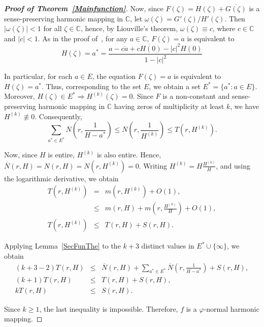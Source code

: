 \documentclass[10pt,a4paper]{amsart}
\numberwithin{equation}{section}
\begin{document}
\begin{proof}[\bf{Proof of Theorem~\ref{Mainfunction}}]
Now, since $F(\zeta)=H(\zeta)+\overline{G(\zeta)}$ is a 
sense-preserving harmonic mapping in $\mathbb{C}$, let 
$\omega(\zeta)=G'(\zeta)/H'(\zeta)$. Then $|\omega(\zeta)|<1$ for 
all $\zeta \in \mathbb{C}$, hence, by Liouville's theorem, 
$\omega(\zeta)\equiv c$, where $c \in \mathbb{C}$ 
and $|c|<1$. As in the proof of~\cite[Lemma 2.5]{Bohra}, for any
$a\in \mathbb{C}, \,  F(\zeta)=a$ is equivalent to
\begin{equation}\label{eq: HequiF}
  H(\zeta)=a^*= \frac{a-\overline{ca}+\overline{cH(0)}-|c|^2H(0)}{1-|c|^2}
\end{equation}

In particular, for each $a\in E$, the equation $F(\zeta)=a$ is
 equivalent to $H(\zeta)=a^*$. Thus, corresponding to the set
$ E$, we obtain a set $E^*=\{a^*: a\in E \}$. Moreover,
$H(\zeta)\in E^* \Longrightarrow H^{(k)}(\zeta)=0$. Since $F$ 
is a non-constant and sense-preserving harmonic mapping in
 $\mathbb{C}$ having zeros of multiplicity at least
$k$, we have $H^{(k)}\not\equiv 0$. Consequently,
\[
\sum_{a^* \in E^*}\overline{N}\left(r, \frac{1}{H-a^*}\right)\leq  
\overline{N}\left(r, \frac{1}{H^{(k)}}\right)\leq T(r,H^{(k)}).
\] 

Now, since $H$ is entire, $H^{(k)}$ is also entire. Hence,
$\overline{N}(r,H)= N(r,H)=
    N(r,H^{(k)})=0$. Writing $H^{(k)}=H\frac{H^{(k)}}{H}$, 
    and using the logarithmic derivative, we 
    obtain  
    \begin{eqnarray}\label{logrderiv}
    T(r,H^{(k)})&=&m(r,H^{(k)})+O(1),\nonumber \\
    &\leq& m(r,H)+m(r,\frac{H^{(k)}}{H})+O(1),\nonumber \\
    T(r,H^{(k)})&\leq& T(r,H)+S(r,H).
   \end{eqnarray}

   Applying Lemma~\ref{SecFunThe} to the $k+3$ distinct values
   in $E^*\cup \{\infty\}$, we obtain   
\begin{eqnarray*}
  (k+3-2)T(r,H) &\leq &\overline{N}(r,H) +\sum_{a^* \in E^*}
  \overline{N}\left(r,\frac{1}{H-a^*}\right) +S(r,H), \\
  (k+1)T(r,H)&\leq& T(r,H)+S(r,H),  \\
    kT(r,H) &\leq& S(r,H).
\end{eqnarray*} 

Since $k \geq 1$, the last inequality is impossible. Therefore, $f$ 
is a $\varphi$-normal harmonic mapping.
\end{proof}\medskip
\end{document}
